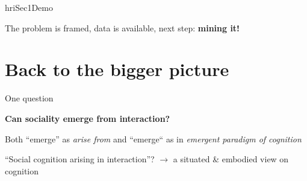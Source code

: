 \documentclass[compress]{beamer}
\begin{document}
{
\begin{frame}[plain]

    \vspace{7cm}

\begin{beamercolorbox}[wd=\linewidth,ht=6ex,dp=0.7ex]{hriSec1Demo}

    The problem is framed, data is available, next step: {\bf mining it!}
\end{beamercolorbox}
\end{frame}
}



\section[Conclusion]{Back to the bigger picture}

\begin{frame}{One question}

    \Large
    \centering

    {\bf Can sociality emerge from interaction?}

    \pause
    \normalsize
    \vspace{2em}

    Both ``emerge'' as \emph{arise from} and ``emerge`` as in \emph{emergent paradigm of
    cognition}

    \pause

    ``Social cognition arising in interaction''? $\rightarrow$ a situated \&
    embodied view on cognition

\end{frame}
\end{document}
